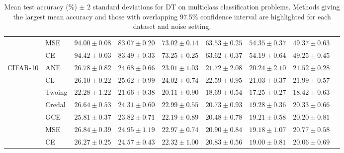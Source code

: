 \documentclass[letterpaper]{article} %
\begin{document}
\begin{table}[t]
\begin{tabular}{clccccccc}
 & MSE    & $94.00 \pm 0.08$ & $83.07 \pm 0.20$ & $73.02 \pm 0.14$ & $63.53 \pm 0.25$ & $54.35 \pm 0.37$ & $49.37 \pm 0.63$ \\
 & CE     & $\mathbf{94.42 \pm 0.03}$ & $83.49 \pm 0.33$ & $73.25 \pm 0.25$ & $63.62 \pm 0.37$ & $54.19 \pm 0.64$ & $49.25 \pm 0.45$ \\
\hline
\multirow{7}{*}{CIFAR-10}
 & ANE    & $\mathbf{26.78 \pm 0.82}$ & $\mathbf{24.68 \pm 0.66}$ & $\mathbf{23.01 \pm 1.03}$ & $\mathbf{21.72 \pm 2.08}$ & $\mathbf{20.24 \pm 2.10}$ & $\mathbf{21.52 \pm 0.28}$ \\
 & CL     & $26.10 \pm 0.22$ & $\mathbf{25.62 \pm 0.99}$ & $\mathbf{24.02 \pm 0.74}$ & $\mathbf{22.59 \pm 0.95}$ & $\mathbf{21.03 \pm 0.37}$ & $\mathbf{21.99 \pm 0.57}$ \\
 & Twoing & $22.28 \pm 1.22$ & $21.66 \pm 0.38$ & $20.11 \pm 0.90$ & $18.69 \pm 0.54$ & $17.25 \pm 0.27$ & $18.42 \pm 0.63$ \\
 & Credal & $\mathbf{26.64 \pm 0.53}$ & $24.31 \pm 0.60$ & $22.99 \pm 0.55$ & $20.73 \pm 0.93$ & $19.28 \pm 0.36$ & $20.33 \pm 0.66$ \\
 & GCE    & $25.81 \pm 0.37$ & $23.82 \pm 0.71$ & $22.19 \pm 0.89$ & $20.48 \pm 0.78$ & $19.21 \pm 0.58$ & $20.20 \pm 0.81$ \\
 & MSE    & $\mathbf{26.84 \pm 0.39}$ & $\mathbf{24.95 \pm 1.19}$ & $\mathbf{22.97 \pm 0.74}$ & $20.90 \pm 0.84$ & $19.18 \pm 1.07$ & $20.77 \pm 0.58$ \\
 & CE     & $26.27 \pm 0.25$ & $\mathbf{24.57 \pm 0.43}$ & $22.32 \pm 1.00$ & $20.83 \pm 0.56$ & $19.00 \pm 0.81$ & $20.06 \pm 0.69$ \\
\hline
\end{tabular}
\caption{Mean test accuracy (\%) $\pm$ 2 standard deviations for DT on multiclass classification problems. Methods giving the largest mean accuracy and those with overlapping 97.5\% confidence interval are highlighted for each dataset and noise setting.}
\label{tab:dt-mc}
\end{table}
\end{document}
